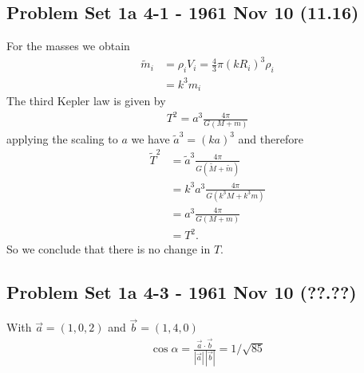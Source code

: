 \documentclass[10pt,a4paper]{book}
\theoremstyle{definition}
\begin{document}
\subsection{Problem Set 1a 4-1 - 1961 Nov 10 (11.16)}
For the masses we obtain
\begin{align}
\widetilde{m}_i
&=\rho_i V_i=\frac{4}{3}\pi (kR_i)^3\rho_i\\
&=k^3m_i
\end{align}
The third Kepler law is given by
\begin{align}
T^2=a^3\frac{4\pi}{G(M+m)}
\end{align}
applying the scaling to $a$ we have $\widetilde{a}^3=(ka)^3$ and therefore
\begin{align}
\widetilde{T}^2
&=\widetilde{a}^3\frac{4\pi}{G(\widetilde{M}+\widetilde{m})}\\
&=k^3a^3\frac{4\pi}{G(k^3M+k^3m)}\\
&=a^3\frac{4\pi}{G(M+m)}\\
&=T^2.
\end{align}
So we conclude that there is no change in $T$. 

\subsection{Problem Set 1a 4-3 - 1961 Nov 10 (??.??)}
With $\vec{a}=(1,0,2)$ and $\vec{b}=(1,4,0)$
\begin{align}
\cos\alpha=\frac{\vec{a}\cdot\vec{b}}{|\vec{a}|\,|\vec{b}|}
=1/\sqrt{85}
\end{align}
\end{document}
